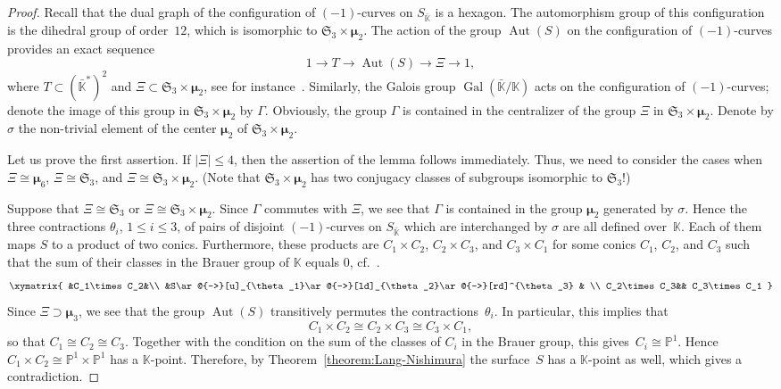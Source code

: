 \documentclass[12pt]{amsart}
\theoremstyle{definition}
\theoremstyle{remark}
\newcommand{\PP}{\mathbb{P}}
\newcommand{\KK}{\mathbb{K}}
\newcommand{\SSS}{\mathfrak{S}}
\newcommand{\mumu}{{\boldsymbol{\mu}}}
\newcommand{\Aut}{\operatorname{Aut}}
\newcommand{\Gal}{\operatorname{Gal}}
\def \le {\leqslant}
\begin{document}
\begin{proof}
Recall that the dual graph of the configuration of $(-1)$-curves on $S_{\bar{\KK}}$ is a hexagon.
The automorphism group of this configuration
is the dihedral group of order~$12$, which is isomorphic to $\SSS_3\times\mumu_2$.
The action of the group $\Aut(S)$ on
the configuration of $(-1)$-curves provides an exact sequence
$$
1\to T\to \Aut(S)\to \Xi\to 1,
$$
where $T\subset (\bar{\KK}^*)^2$ and $\Xi\subset\SSS_3\times\mumu_2$, see for instance~\mbox{\cite[Theorem~8.4.2]{Dolgachev}}.
Similarly, the Galois group $\Gal(\bar{\KK}/\KK)$ acts on the
configuration of $(-1)$-curves; denote the image of this group in
$\SSS_3\times\mumu_2$ by $\Gamma$. Obviously, the group $\Gamma$ is contained in the centralizer of the group
$\Xi$ in $\SSS_3\times\mumu_2$. Denote by $\sigma$ the non-trivial element of the center $\mumu_2$ of $\SSS_3\times\mumu_2$.

Let us prove the first assertion. If $|\Xi|\le 4$, then the assertion of the lemma follows immediately.
Thus, we need to consider the cases when $\Xi\cong\mumu_6$, $\Xi\cong\SSS_3$, and $\Xi\cong\SSS_3\times\mumu_2$.
(Note that $\SSS_3\times\mumu_2$ has two conjugacy classes of subgroups isomorphic to $\SSS_3$!)

Suppose that $\Xi\cong\SSS_3$ or $\Xi\cong\SSS_3\times\mumu_2$.
Since $\Gamma$ commutes with $\Xi$, we see that $\Gamma$ is contained in the group
$\mumu_2$ generated by $\sigma$. Hence the three contractions $\theta_i$, $1\le i\le 3$, of
pairs of disjoint $(-1)$-curves on $S_{\bar{\KK}}$ which are interchanged by $\sigma$ are all
defined over~$\KK$. Each of them maps $S$ to a product of two conics.
Furthermore, these products are $C_1\times C_2$, $C_2\times C_3$, and $C_3\times C_1$
for some conics $C_1$, $C_2$, and $C_3$ such that the sum of their classes in the Brauer group of $\KK$
equals $0$, cf.~\mbox{\cite[Lemma~3.2]{Trepalin-pointless}}.
\begin{equation}\label{eq:3-contractions}
\xymatrix{
&C_1\times C_2&\\
&S\ar@{->}[u]_{\theta_1}\ar@{->}[ld]_{\theta_2}\ar@{->}[rd]^{\theta_3} & \\
C_2\times C_3&& C_3\times C_1
}
\end{equation}
Since $\Xi\supset\mumu_3$, we see that the group $\Aut(S)$ transitively permutes
the contractions~$\theta_i$. In particular, this implies that
$$
C_1\times C_2\cong C_2\times C_3\cong C_3\times C_1,
$$
so that $C_1\cong C_2\cong C_3$. Together with the condition on the sum of the classes of $C_i$ in
the Brauer group, this gives~\mbox{$C_i\cong\PP^1$}. Hence $C_1\times C_2\cong \PP^1\times\PP^1$ has a $\KK$-point.
Therefore, by Theorem~\ref{theorem:Lang-Nishimura} the surface~$S$ has a $\KK$-point as well, which gives a contradiction.


\end{proof}
\end{document}
